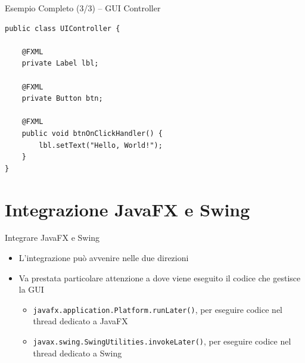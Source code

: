 \documentclass[presentation]{beamer}
\begin{document}
\begin{frame}[fragile]{Esempio Completo (3/3) -- GUI Controller}
\begin{lstlisting}
public class UIController {

	@FXML
	private Label lbl;

	@FXML
	private Button btn;

	@FXML
	public void btnOnClickHandler() {
		lbl.setText("Hello, World!");
	}
}
\end{lstlisting}
\end{frame}

\section{Integrazione JavaFX e Swing}

\begin{frame}{Integrare JavaFX e Swing}
\begin{itemize}
\item L'integrazione può avvenire nelle due direzioni
\item Va prestata particolare attenzione a dove viene eseguito il codice che gestisce la GUI
\begin{itemize}
\item \texttt{javafx.application.Platform.runLater()}, per eseguire codice nel thread dedicato a JavaFX
\item \texttt{javax.swing.SwingUtilities.invokeLater()}, per eseguire codice nel thread dedicato a Swing
\end{itemize}
\end{itemize}
\end{frame}
\end{document}
